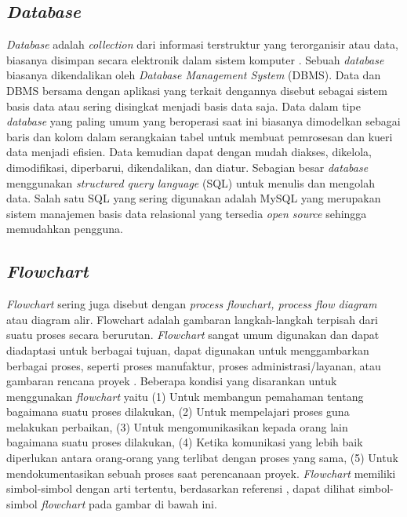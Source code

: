 \begin{flushleft}
\begin{justify}
        \subsection{\textit{Database}}
            \textit{Database} adalah \textit{collection} dari informasi terstruktur yang terorganisir atau data, biasanya disimpan secara elektronik dalam sistem komputer \cite{Database}. Sebuah \textit{database} biasanya dikendalikan oleh \textit{Database Management System} (DBMS). Data dan DBMS bersama dengan aplikasi yang terkait dengannya disebut sebagai sistem basis data atau sering disingkat menjadi basis data saja.
            Data dalam tipe \textit{database} yang paling umum yang beroperasi saat ini biasanya dimodelkan sebagai baris dan kolom dalam serangkaian tabel untuk membuat pemrosesan dan kueri data menjadi efisien. Data kemudian dapat dengan mudah diakses, dikelola, dimodifikasi, diperbarui, dikendalikan, dan diatur. Sebagian besar \textit{database} menggunakan \textit{structured query language} (SQL) untuk menulis dan mengolah data. 
            Salah satu SQL yang sering digunakan adalah MySQL yang merupakan sistem manajemen basis data relasional yang tersedia \textit{open source} sehingga memudahkan pengguna.
            \\
        \subsection{\textit{Flowchart}}
            \textit{Flowchart} sering juga disebut dengan \textit{process flowchart, process flow diagram} atau diagram alir. Flowchart adalah gambaran langkah-langkah terpisah dari suatu proses secara berurutan. 
            \textit{Flowchart} sangat umum digunakan dan dapat diadaptasi untuk berbagai tujuan, dapat digunakan untuk menggambarkan berbagai proses, seperti proses manufaktur, proses administrasi/layanan, atau gambaran rencana proyek \cite{Flowchart}.
            Beberapa kondisi yang disarankan untuk menggunakan \textit{flowchart} yaitu 
            (1) Untuk membangun pemahaman tentang bagaimana suatu proses dilakukan,
            (2) Untuk mempelajari proses guna melakukan perbaikan,
            (3) Untuk mengomunikasikan kepada orang lain bagaimana suatu proses dilakukan,
            (4) Ketika komunikasi yang lebih baik diperlukan antara orang-orang yang terlibat dengan proses yang sama,
            (5) Untuk mendokumentasikan sebuah proses saat perencanaan proyek. \textit{Flowchart} memiliki simbol-simbol dengan arti tertentu, berdasarkan referensi \cite{gambar fc}, dapat dilihat simbol-simbol \emph{flowchart} pada gambar di bawah ini.
            \begin{figure}[ht]
                \centering
               

\end{figure}
\end{justify}
\end{flushleft}
